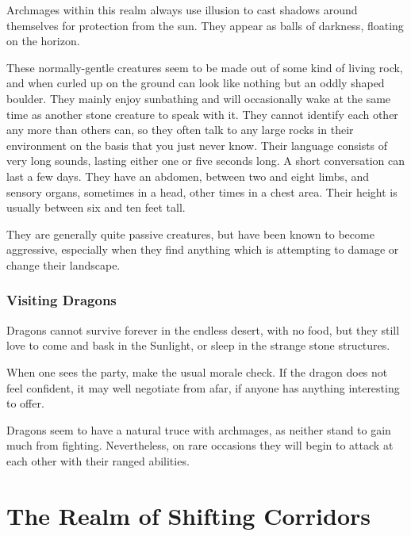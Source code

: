 \begin{multicols}{2}
Archmages within this realm always use illusion to cast shadows around themselves for protection from the sun.
They appear as balls of darkness, floating on the horizon.


\label{rockman}

These normally-gentle creatures seem to be made out of some kind of living rock, and when curled up on the ground can look like nothing but an oddly shaped boulder.
They mainly enjoy sunbathing and will occasionally wake at the same time as another stone creature to speak with it.
They cannot identify each other any more than others can, so they often talk to any large rocks in their environment on the basis that you just never know.
Their language consists of very long sounds, lasting either one or five seconds long.
A short conversation can last a few days.
They have an abdomen, between two and eight limbs, and sensory organs, sometimes in a head, other times in a chest area.
Their height is usually between six and ten feet tall.

They are generally quite passive creatures, but have been known to become aggressive, especially when they find anything which is attempting to damage or change their landscape.


\subsubsection{Visiting Dragons}

Dragons cannot survive forever in the endless desert, with no food, but they still love to come and bask in the Sunlight, or sleep in the strange stone structures.

\dragon

When one sees the party, make the usual morale check.
If the dragon does not feel confident, it may well negotiate from afar, if anyone has anything interesting to offer.

Dragons seem to have a natural truce with archmages, as neither stand to gain much from fighting.
Nevertheless, on rare occasions they will begin to attack at each other with their ranged abilities.

\end{multicols}

\section{The Realm of Shifting Corridors}\label{shiftingcorridors}

